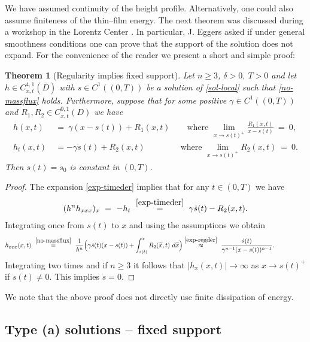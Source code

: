 \documentclass[pagesize,pdftex]{amsart}
\newtheorem{theorem}{Theorem}[section]
\newcommand{\OL}[0]{\overline} %
\renewcommand{\t}{\tilde}
\renewcommand{\tilde}{\widetilde}
\renewcommand{\d}{\delta}
\newcommand{\DS}{\displaystyle}
\newcommand{\gam}{\gamma}
\begin{document}
We have assumed continuity of the height profile. Alternatively, one could also
assume finiteness of the thin--film energy.  The next theorem was discussed
during a workshop in the Lorentz Center \cite{Lorentz-Center}. In particular,
J. Eggers asked if under general smoothness conditions one can prove that the
support of the solution does not expand. For the convenience of the reader we
present a short and simple proof: 
\begin{theorem}[Regularity implies fixed support] \label{thm-nomove} %
  Let $n \geq 3$, $\d >0,\ T>0$ and let $h\in C_{x,t}^{4,1}(\OL D)$ with
  $s\in C^{1}((0,T))$ be a solution of \eqref{sol-local} such that
  \eqref{no-massflux} holds. Furthermore, suppose that for some positive
  $\gam\in C^{1}((0,T))$ and $R_1, R_2 \in C_{x,t}^{0,1}(D)$ we have
  \begin{align} \label{exp-regder}
    h(x,t) \ %
    &= \ \gam (x-s(t) ) + R_{1}(x,t) \qquad \text{where $\DS \lim_{x\to s(t)^+}\frac{R_{1}(x,t) }{x-s(t)} \ = \ 0$}, \\
    h_t (x,t) \
    &=-%
    \gam \dot s(t) +R_{2}(x,t)\ \qquad\qquad %
    \text{where  $\lim_{x\to s(t)^+}R_{2}(x,t) \ =\ 0$.} \label{exp-timeder} %
  \end{align}
  Then $s(t) = s_0$ is constant in $(0,T)$.
\end{theorem}
\begin{proof}
  The expansion \eqref{exp-timeder}  implies that for any $t \in (0,T)$ we have     
  \begin{align}
    (h^n h_{xxx})_x \ %
    = \ - h_t \ 
    \stackrel{\eqref{exp-timeder}}= \ \gam \dot s(t) - R_{2}(x,t).  %
  \end{align}
  Integrating once from $s(t)$ to $x$ and using the assumptions  we obtain
  \begin{align}
    h_{xxx}(x,t) \ %
    &\stackrel{\eqref{no-massflux}}= \  \frac 1{h^n} \Big(\gam \dot s(t) (x-s(t)) + \int_{s(t)}^x R_2(\t x,t) \ d \t x \Big) \stackrel{\eqref{exp-regder}}\approx \  \frac{\dot s(t)}{\gam^{n-1} (x-s(t))^{n-1}}. \qquad\qquad %
  \end{align}
  Integrating two times and if $n \geq 3$ it follows that
  $|h_x(x,t)| \to \infty$ as $x\to s(t)^+$ if $\dot s(t) \neq
  0$. This implies  $\dot s = 0$.
\end{proof}
We note that the above proof does not directly use finite dissipation of
energy.

\subsection{Type (a) solutions -- fixed  support}
\end{document}

